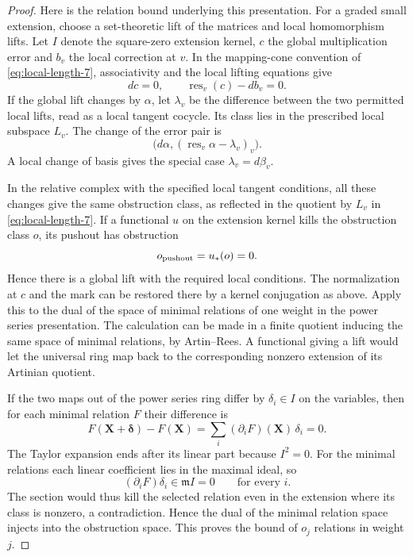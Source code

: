 \begin{proof}
Here is the relation bound underlying this presentation.
For a graded small extension, choose a set-theoretic
lift of the matrices and local homomorphism lifts.
Let \(I\) denote the square-zero extension kernel, \(c\) the global multiplication error and \(b_v\) the local correction at \(v\). In the mapping-cone convention of \eqref{eq:local-length-7}, associativity and the local lifting equations give
\[
  dc=0,\qquad \operatorname{res}_v(c)-db_v=0 .
\]
If the global lift changes by \(\alpha\), let \(\lambda_v\) be the difference between the two permitted local lifts, read as a local tangent cocycle. Its class lies in the prescribed local subspace \(L_v\). The change of the error pair is
\[
   \bigl(d\alpha,(\operatorname{res}_v\alpha-\lambda_v)_v\bigr).
\]
A local change of basis gives the special case \(\lambda_v=d\beta_v\).

In the relative complex with the specified local tangent conditions, all these changes give the same obstruction class, as reflected in the quotient by \(L_v\) in \eqref{eq:local-length-7}. If a functional \(u\) on the extension kernel kills the obstruction class \(o\), its pushout has obstruction
\[
 o_{\rm pushout}=u_*(o)=0 .
\]
Hence there is a global lift with the required local conditions. The normalization at \(c\)
and the mark can be restored there by a kernel
conjugation as above. Apply this to the dual of the
space of minimal relations of one weight in the
power series presentation. The calculation can be
made in a finite quotient inducing the same space
of minimal relations, by Artin--Rees. A functional
giving a lift would let the universal ring map back
to the corresponding nonzero extension of its
Artinian quotient.

If the two maps out of the power series ring differ by \(\delta_i\in I\) on the variables, then for each minimal relation \(F\) their difference is
\[
 F(\mathbf X+\boldsymbol\delta)-F(\mathbf X)
     =\sum_i (\partial_i F)(\mathbf X)\,\delta_i=0.
\]
The Taylor expansion ends after its linear part because \(I^2=0\). For the minimal relations each linear coefficient lies in the maximal ideal, so 
\[
 (\partial_i F)\delta_i\in\mathfrak m I=0\qquad\text{for every }i.
\]
 The section would thus kill the selected relation even in the extension where its class is nonzero, a contradiction. Hence the dual
of the minimal relation space injects into
the obstruction space. This proves the bound of
\(o_j\) relations in weight \(j\).


\end{proof}
